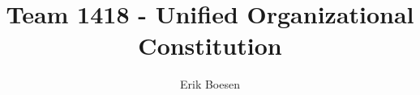 \documentclass{proc}
\begin{document}
\title{Team 1418 - Unified Organizational Constitution}
\author{Erik Boesen}

\maketitle
\end{document}
